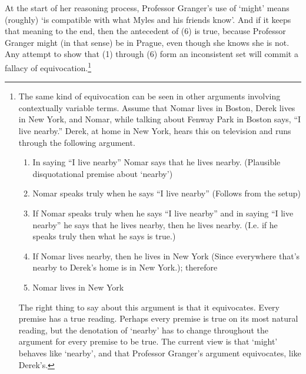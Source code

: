 \documentclass[
  11pt,
  letterpaper,
  DIV=11,
  numbers=noendperiod]{scrartcl}
\begin{document}
At the start of her reasoning process, Professor Granger's use of
`might' means (roughly) `is compatible with what Myles and his friends
know'. And if it keeps that meaning to the end, then the antecedent of
(6) is true, because Professor Granger might (in that sense) be in
Prague, even though she knows she is not. Any attempt to show that (1)
through (6) form an inconsistent set will commit a fallacy of
equivocation.\footnote{The same kind of equivocation can be seen in
  other arguments involving contextually variable terms. Assume that
  Nomar lives in Boston, Derek lives in New York, and Nomar, while
  talking about Fenway Park in Boston says, ``I live nearby.'' Derek, at
  home in New York, hears this on television and runs through the
  following argument.

  \begin{enumerate}
  \def\labelenumi{\arabic{enumi}.}
  \item
    In saying ``I live nearby'' Nomar says that he lives nearby.
    (Plausible disquotational premise about `nearby')
  \item
    Nomar speaks truly when he says ``I live nearby'' (Follows from the
    setup)
  \item
    If Nomar speaks truly when he says ``I live nearby'' and in saying
    ``I live nearby'' he says that he lives nearby, then he lives
    nearby. (I.e. if he speaks truly then what he says is true.)
  \item
    If Nomar lives nearby, then he lives in New York (Since everywhere
    that's nearby to Derek's home is in New York.); therefore
  \item
    Nomar lives in New York
  \end{enumerate}

  The right thing to say about this argument is that it equivocates.
  Every premise has a true reading. Perhaps every premise is true on its
  most natural reading, but the denotation of `nearby' has to change
  throughout the argument for every premise to be true. The current view
  is that `might' behaves like `nearby', and that Professor Granger's
  argument equivocates, like Derek's.}
\end{document}
